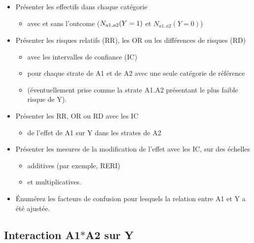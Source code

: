 \documentclass[
]{book}
\providecommand{\tightlist}{%
  \setlength{\itemsep}{0pt}\setlength{\parskip}{0pt}}
\begin{document}
\begin{itemize}
\tightlist
\item
  Présenter les effectifs dans chaque catégorie

  \begin{itemize}
  \tightlist
  \item
    avec et sans l'outcome (\(\small N_{a1,a2}(Y=1)\) et \(N_{a1,a2}(Y=0)\))
  \end{itemize}
\item
  Présenter les risques relatifs (RR), les OR ou les différences de risques (RD)

  \begin{itemize}
  \tightlist
  \item
    avec les intervalles de confiance (IC)
  \item
    pour chaque strate de A1 et de A2 avec une seule catégorie de référence
  \item
    (éventuellement prise comme la strate A1.A2 présentant le plus faible risque de Y).
  \end{itemize}
\item
  Présenter les RR, OR ou RD avec les IC

  \begin{itemize}
  \tightlist
  \item
    de l'effet de A1 sur Y dans les strates de A2
  \end{itemize}
\item
  Présenter les mesures de la modification de l'effet avec les IC, sur des échelles

  \begin{itemize}
  \tightlist
  \item
    additives (par exemple, RERI)
  \item
    et multiplicatives.
  \end{itemize}
\item
  Énumérez les facteurs de confusion pour lesquels la relation entre A1 et Y a été ajustée.
\end{itemize}

\hypertarget{interaction-a1a2-sur-y}{%
\subsection*{\texorpdfstring{Interaction A1\(*\)A2 sur Y}{Interaction A1*A2 sur Y}}\label{interaction-a1a2-sur-y}}
\end{document}
